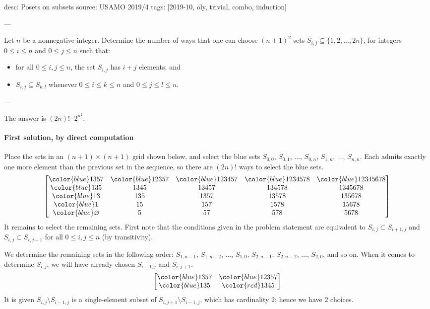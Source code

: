 desc: Posets on subsets
source: USAMO 2019/4
tags: [2019-10, oly, trivial, combo, induction]

---

Let $n$ be a nonnegative integer. Determine the number of ways that one can choose $(n+1)^2$ sets $S_{i,j}\subseteq\{1,2,\ldots,2n\}$, for integers $0\le i\le n$ and $0\le j\le n$ such that:
\begin{itemize}[itemsep=0em]
    \item for all $0\le i,j\le n$, the set $S_{i,j}$ has $i+j$ elements; and
    \item $S_{i,j}\subseteq S_{k,l}$ whenever $0\leq i\leq k\leq n$ and $0\leq j\leq l\leq n$.
\end{itemize}

---

The answer is $(2n)!\cdot2^{n^2}$.

\paragraph{First solution, by direct computation} Place the sets in an $(n+1)\times(n+1)$ grid shown below, and select the blue sets $S_{0,0}$, $S_{0,1}$, $\ldots$, $S_{0,n}$, $S_{1,n}$, $\ldots$, $S_{n,n}$. Each admits exactly one more element than the previous set in the sequence, so there are $(2n)!$ ways to select the blue sets.
\[
    \begin{bmatrix}
        {\color{blue}1357}&{\color{blue}12357}&{\color{blue}123457}&{\color{blue}1234578}&{\color{blue}12345678}\\
        {\color{blue}135}&1345&13457&134578&1345678\\
        {\color{blue}13}&135&1357&13578&135678\\
        {\color{blue}1}&15&157&1578&15678\\
        {\color{blue}\varnothing}&5&57&578&5678
    \end{bmatrix}
\]
It remains to select the remaining sets. First note that the conditions given in the problem statement are equivalent to $S_{i,j}\subset S_{i+1,j}$ and $S_{i,j}\subset S_{i,j+1}$ for all $0\le i,j\le n$ (by transitivity).

We determine the remaining sets in the following order: $S_{1,n-1}$, $S_{1,n-2}$, $\ldots$, $S_{1,0}$, $S_{2,n-1}$, $S_{2,n-2}$, $\ldots$, $S_{2,0}$, and so on. When it comes to determine $S_{i,j}$, we will have already chosen $S_{i-1,j}$ and $S_{i,j+1}$.
\[
    \begin{bmatrix}
        {\color{blue}1357}&{\color{blue}12357}\\
        {\color{blue}135}&{\color{red}1345}
    \end{bmatrix}
\]
It is given $S_{i,j}\setminus S_{i-1,j}$ is a single-element subset of $S_{i,j+1}\setminus S_{i-1,j}$, which has cardinality $2$; hence we have $2$ choices.

